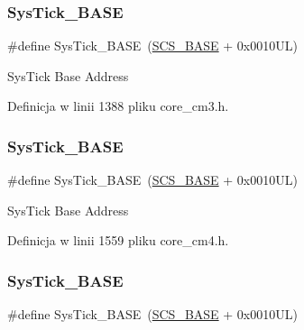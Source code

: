 \subsubsection{\texorpdfstring{Sys\+Tick\+\_\+\+B\+A\+SE}{SysTick\_BASE}\hspace{0.1cm}{\footnotesize\ttfamily [8/12]}}
{\footnotesize\ttfamily \#define Sys\+Tick\+\_\+\+B\+A\+SE~(\hyperlink{group___c_m_s_i_s__core__base_ga3c14ed93192c8d9143322bbf77ebf770}{S\+C\+S\+\_\+\+B\+A\+SE} +  0x0010\+U\+L)}

Sys\+Tick Base Address 

Definicja w linii 1388 pliku core\+\_\+cm3.\+h.

\mbox{\label{group___c_m_s_i_s__core__base_ga58effaac0b93006b756d33209e814646}} 
\subsubsection{\texorpdfstring{Sys\+Tick\+\_\+\+B\+A\+SE}{SysTick\_BASE}\hspace{0.1cm}{\footnotesize\ttfamily [9/12]}}
{\footnotesize\ttfamily \#define Sys\+Tick\+\_\+\+B\+A\+SE~(\hyperlink{group___c_m_s_i_s__core__base_ga3c14ed93192c8d9143322bbf77ebf770}{S\+C\+S\+\_\+\+B\+A\+SE} +  0x0010\+U\+L)}

Sys\+Tick Base Address 

Definicja w linii 1559 pliku core\+\_\+cm4.\+h.

\mbox{\label{group___c_m_s_i_s__core__base_ga58effaac0b93006b756d33209e814646}} 
\subsubsection{\texorpdfstring{Sys\+Tick\+\_\+\+B\+A\+SE}{SysTick\_BASE}\hspace{0.1cm}{\footnotesize\ttfamily [10/12]}}
{\footnotesize\ttfamily \#define Sys\+Tick\+\_\+\+B\+A\+SE~(\hyperlink{group___c_m_s_i_s__core__base_ga3c14ed93192c8d9143322bbf77ebf770}{S\+C\+S\+\_\+\+B\+A\+SE} +  0x0010\+U\+L)}

